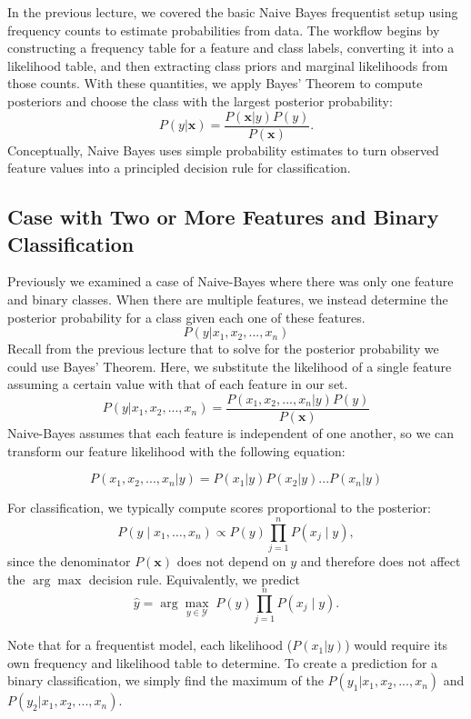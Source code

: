 \documentclass{article}
\begin{document}
In the previous lecture, we covered the basic Naive Bayes frequentist setup using frequency counts to estimate probabilities from data. The workflow begins by constructing a frequency table for a feature and class labels, converting it into a likelihood table, and then extracting class priors and marginal likelihoods from those counts. With these quantities, we apply Bayes' Theorem to compute posteriors and choose the class with the largest posterior probability:
\[
P(y|\textbf{x}) = \frac{P(\textbf{x}|y)P(y)}{P(\textbf{x})}.
\]
Conceptually, Naive Bayes uses simple probability estimates to turn observed feature values into a principled decision rule for classification.


\subsection{Case with Two or More Features and Binary Classification}
Previously we examined a case of Naive-Bayes where there was only one feature and binary classes. When there are multiple features, we instead determine the posterior probability for a class given each one of these features. 
\[
P(y|\textbf{$x_1$},\textbf{$x_2$}, ..., x_n)
\]
Recall from the previous lecture that to solve for the posterior probability we could use Bayes' Theorem. Here, we substitute the likelihood of a single feature assuming a certain value with that of each feature in our set.
\[
P(y|x_1, x_2, ..., x_n ) = \frac{P(x_1, x_2, ..., x_n |y)P(y)}{P(\textbf{x})}
\]
Naive-Bayes assumes that each feature is independent of one another, so we can transform our feature likelihood with the following equation:

\[
P(x_1, x_2, ..., x_n |y) = P(x_1 | y)P(x_2 | y)...P(x_n | y)
\]


For classification, we typically compute scores proportional to the posterior:
\[
P(y\mid x_1,\dots,x_n)\propto P(y)\prod_{j=1}^n P(x_j\mid y),
\]
since the denominator $P(\mathbf{x})$ does not depend on $y$ and therefore does not affect the $\arg\max$ decision rule. Equivalently, we predict
\[
\hat{y}=\arg\max_{y\in\mathcal{Y}} \; P(y)\prod_{j=1}^n P(x_j\mid y).
\]

Note that for a frequentist model, each likelihood ($P(x_1 | y)$) would require its own frequency and likelihood table to determine. 
To create a prediction for a binary classification, we simply find the maximum of the $P(y_1 |x_1, x_2, ..., x_n )$ and $P(y_2 |x_1, x_2, ..., x_n )$.
\end{document}
